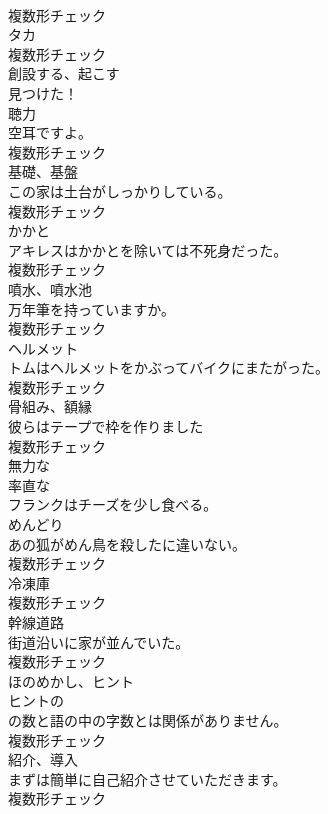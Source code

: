 \documentclass[8pt]{extreport}
\begin{document}
\begin{CJK}{UTF8}{min}
\\	複数形チェック
\\	[名詞]	タカ	
\\	複数形チェック
\\	[動詞]	創設する、起こす	
\\	見つけた！	
\\	[名詞]	聴力	
\\	空耳ですよ。	
\\	複数形チェック
\\	[名詞]	基礎、基盤	
\\	この家は土台がしっかりしている。	
\\	複数形チェック
\\	[名詞]	かかと	
\\	アキレスはかかとを除いては不死身だった。	
\\	複数形チェック
\\	[名詞]	噴水、噴水池	
\\	万年筆を持っていますか。	
\\	複数形チェック
\\	[名詞]	ヘルメット	
\\	トムはヘルメットをかぶってバイクにまたがった。	
\\	複数形チェック
\\	[名詞]	骨組み、額縁	
\\	彼らはテープで枠を作りました	
\\	複数形チェック
\\	[形容詞]	無力な	
\\	[形容詞]	率直な	
\\	フランクはチーズを少し食べる。	
\\	[名詞]	めんどり	
\\	あの狐がめん鳥を殺したに違いない。	
\\	複数形チェック
\\	[名詞]	冷凍庫	
\\	複数形チェック
\\	[名詞]	幹線道路	
\\	街道沿いに家が並んでいた。	
\\	複数形チェック
\\	[名詞]	ほのめかし、ヒント	
\\	ヒントの 
\\	の数と語の中の字数とは関係がありません。	
\\	複数形チェック
\\	[名詞]	紹介、導入	
\\	まずは簡単に自己紹介させていただきます。	
\\	複数形チェック

\end{CJK}
\end{document}
